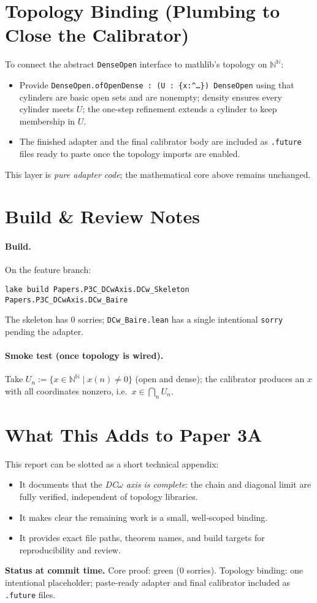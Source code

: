 \documentclass[11pt]{article}
\newcommand{\NN}{\mathbb{N}}
\newcommand{\Seq}{\NN^{\NN}}  %
\theoremstyle{definition}
\theoremstyle{plain}
\begin{document}
\section{Topology Binding (Plumbing to Close the Calibrator)}
\label{sec:binding}
To connect the abstract \texttt{DenseOpen} interface to mathlib's topology on $\Seq$:
\begin{itemize}[leftmargin=1.5em]
  \item Provide \texttt{DenseOpen.ofOpenDense : (U : \{x:\Seq \mid \dots\}) \to \texttt{DenseOpen}}
  using that cylinders are basic open sets and are nonempty; density ensures every cylinder meets $U$;
  the one‑step refinement extends a cylinder to keep membership in $U$.
  \item The finished adapter and the final calibrator body are included as
  \texttt{.future} files ready to paste once the topology imports are enabled.
\end{itemize}
This layer is \emph{pure adapter code}; the mathematical core above remains unchanged.

\section{Build \& Review Notes}
\label{sec:build}
\paragraph{Build.}
On the feature branch:
\begin{verbatim}
lake build Papers.P3C_DCwAxis.DCw_Skeleton Papers.P3C_DCwAxis.DCw_Baire
\end{verbatim}
The skeleton has $0$ sorries; \texttt{DCw\_Baire.lean} has a single
intentional \texttt{sorry} pending the adapter.

\paragraph{Smoke test (once topology is wired).}
Take $U_n := \{x \in \Seq \mid x(n) \neq 0\}$ (open and dense); the calibrator
produces an $x$ with all coordinates nonzero, i.e.\ $x \in \bigcap_n U_n$.

\section{What This Adds to Paper 3A}
\label{sec:integration}
This report can be slotted as a short technical appendix:
\begin{itemize}[leftmargin=1.5em]
  \item It documents that the \emph{DC$\omega$ axis is complete}: the chain and
  diagonal limit are fully verified, independent of topology libraries.
  \item It makes clear the remaining work is a small, well‑scoped binding.
  \item It provides exact file paths, theorem names, and build targets for
  reproducibility and review.
\end{itemize}

\vspace{1ex}
\noindent\textbf{Status at commit time.}
Core proof: green (0 sorries). Topology binding: one intentional placeholder;
paste‑ready adapter and final calibrator included as \texttt{.future} files.
\end{document}
